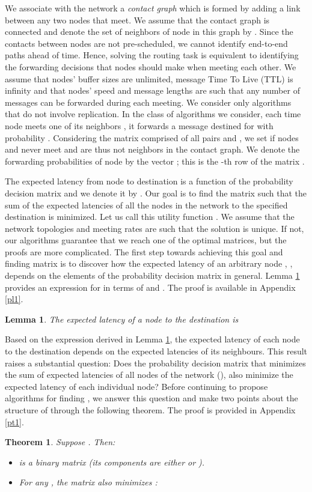 \documentclass[journal,onecolumn,11pt]{IEEEtran}
\theoremstyle{plain}
\newtheorem{theorem}{Theorem}
\newtheorem{lemma}{Lemma}
\theoremstyle{definition}
\begin{document}
We associate with the network a {\em contact graph} which is formed by
adding a link between any two nodes that meet. We assume that the
contact graph is connected and denote the set of neighbors of node 
in this graph by . Since the contacts between nodes are
not pre-scheduled, we cannot identify end-to-end paths ahead of
time. Hence, solving the routing task is equivalent to identifying the
forwarding decisions that nodes should make when meeting each
other. We assume that nodes' buffer sizes are unlimited, message Time
To Live (TTL) is infinity and that nodes' speed and message lengths
are such that any number of messages can be forwarded during each
meeting.  We consider only algorithms that do not involve
replication. In the class of algorithms we consider, each time node
 meets one of its neighbors , it forwards a
message destined for  with probability . Considering the
matrix  comprised of all pairs  and ,
we set  if nodes  and  never meet and are thus not
neighbors in the contact graph. We denote the forwarding probabilities
of node  by the vector ; this is the -th row of
the matrix .

The expected latency from node  to destination  is a function of
the probability decision matrix  and we denote it by
. Our goal is to find the matrix 
such that the sum of the expected latencies of all the nodes in the
network to the specified destination  is minimized. Let us call
this utility function . We assume that the network topologies and
meeting rates are such that the solution  is unique. If
not, our algorithms guarantee that we reach one of the optimal
matrices, but the proofs are more complicated.
The first step towards achieving this goal and finding matrix  is to discover how the expected latency of an arbitrary node , , depends on the elements of the probability decision matrix  in general. Lemma \ref{Lid} provides an expression for  in
terms of  and . The proof is available in Appendix \ref{pl1}.


\begin{lemma} \label{Lid}
The expected latency of a node  to the destination  is

\end{lemma}

Based on the expression derived in Lemma \ref{Lid}, the expected latency of each node to the destination depends on the expected latencies of its neighbours. This result raises a substantial question: Does the probability decision  matrix that minimizes the sum of expected latencies of all nodes of the network (), also minimize the expected latency of each individual node? Before continuing to propose algorithms for finding ,
we answer this question and make two points about the structure of  through the
following theorem. The proof is provided in Appendix \ref{pt1}.
\begin{theorem}\label{theorem1}
Suppose . Then:
\begin{itemize}
\item[(1)]  is a binary matrix (its components are either  or ).
\item[(2)] For any , the matrix  also
  minimizes : 

\end{itemize}
\end{theorem}
\end{document}
